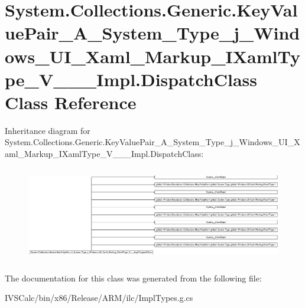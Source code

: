 \hypertarget{class_system_1_1_collections_1_1_generic_1_1_key_value_pair___a___system___type__j___windows___u4cfb99383bfc237b43b5f3dd16b35c62}{}\section{System.\+Collections.\+Generic.\+Key\+Value\+Pair\+\_\+\+A\+\_\+\+System\+\_\+\+Type\+\_\+j\+\_\+\+Windows\+\_\+\+U\+I\+\_\+\+Xaml\+\_\+\+Markup\+\_\+\+I\+Xaml\+Type\+\_\+\+V\+\_\+\+\_\+\+\_\+\+Impl.\+Dispatch\+Class Class Reference}
\label{class_system_1_1_collections_1_1_generic_1_1_key_value_pair___a___system___type__j___windows___u4cfb99383bfc237b43b5f3dd16b35c62}
Inheritance diagram for System.\+Collections.\+Generic.\+Key\+Value\+Pair\+\_\+\+A\+\_\+\+System\+\_\+\+Type\+\_\+j\+\_\+\+Windows\+\_\+\+U\+I\+\_\+\+Xaml\+\_\+\+Markup\+\_\+\+I\+Xaml\+Type\+\_\+\+V\+\_\+\+\_\+\+\_\+\+Impl.\+Dispatch\+Class\+:\begin{figure}[H]
\begin{center}
\leavevmode
\includegraphics[height=4.196185cm]{class_system_1_1_collections_1_1_generic_1_1_key_value_pair___a___system___type__j___windows___u4cfb99383bfc237b43b5f3dd16b35c62}
\end{center}
\end{figure}


The documentation for this class was generated from the following file\+:\begin{DoxyCompactItemize}
\item 
I\+V\+S\+Calc/bin/x86/\+Release/\+A\+R\+M/ilc/Impl\+Types.\+g.\+cs\end{DoxyCompactItemize}
